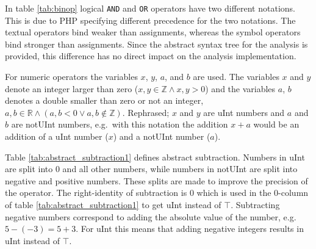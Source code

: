 In table \ref{tab:binop} logical \texttt{AND} and \texttt{OR} operators have two different notations. This is due to PHP specifying different precedence for the two notations. The textual operators bind weaker than assignments, whereas the symbol operators bind stronger than assignments. Since the abstract syntax tree for the analysis is provided, this difference has no direct impact on the analysis implementation.

For numeric operators the variables $x$, $y$, $a$, and $b$ are used. The variables $x$ and $y$ denote an integer larger than zero ($x, y \in \mathbb{Z} \wedge x, y > 0$) and the variables $a$, $b$ denotes a double smaller than zero or not an integer, $a, b \in \mathbb{R} \wedge (a, b < 0 \vee a, b \notin \mathbb{Z})$. Rephrased; $x$ and $y$ are uInt numbers and $a$ and $b$ are notUInt numbers, e.g.\ with this notation the addition $x+a$ would be an addition of a uInt number ($x$) and a notUInt number ($a$).


Table \ref{tab:abstract_subtraction1} defines abstract subtraction. Numbers in uInt are split into 0 and all other numbers, while numbers in notUInt are split into negative and positive numbers. These splits are made to improve the precision of the operator. The right-identity of subtraction is 0 which is used in the 0-column of table \ref{tab:abstract_subtraction1} to get uInt instead of $\top$. Subtracting negative numbers correspond to adding the absolute value of the number, e.g.\ $5 - (-3) = 5 + 3$. For uInt this means that adding negative integers results in uInt instead of $\top$.

